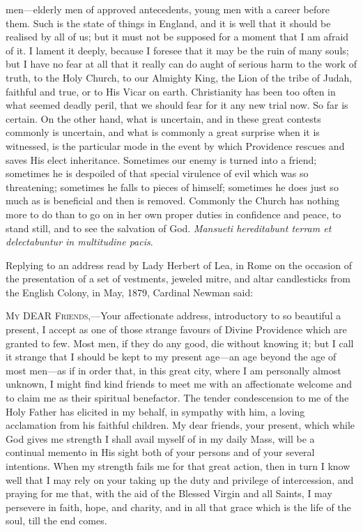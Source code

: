 men—elderly men of approved antecedents, young men with a career
before them. Such is the state of things in England, and it is well
that it should be realised by all of us; but it must not be supposed
for a moment that I am afraid of it. I lament it deeply, because I
foresee that it may be the ruin of many souls; but I have no fear at
all that it really can do aught of serious harm to the work of truth,
to the Holy Church, to our Almighty King, the Lion of the tribe of
Judah, faithful and true, or to His Vicar on earth. Christianity has
been too often in what seemed deadly peril, that we should fear for it
any new trial now. So far is certain. On the other hand, what is
uncertain, and in these great contests commonly is uncertain, and what
is commonly a great surprise when it is witnessed, is the particular
mode in the event by which Providence rescues and saves His elect
inheritance. Sometimes our enemy is turned into a friend; sometimes he
is despoiled of that special virulence of evil which was so
threatening; sometimes he falls to pieces of himself; sometimes he
does just so much as is beneficial and then is removed. Commonly the
Church has nothing more to do than to go on in her own proper duties
in confidence and peace, to stand still, and to see the salvation of
God. \emph{Mansueti hereditabunt terram et delectabuntur in multitudine
pacis}.


Replying to an address read by Lady Herbert of
Lea, in Rome on the occasion of the presentation of a set of
vestments, jeweled mitre, and altar candlesticks from the English
Colony, in May, 1879, Cardinal Newman said:

M\textsc{y} DEAR
F\textsc{riends},—Your affectionate address,
introductory to so beautiful a present, I accept as one of those
strange favours of Divine Providence which are granted to few. Most
men, if they do any good, die without knowing it; but I call it
strange that I should be kept to my present age—an age beyond the
age of most men—as if in order that, in this great city, where I am
personally almost unknown, I might find kind friends to meet me with
an affectionate welcome and to claim me as their spiritual benefactor.
The tender condescension to me of the Holy Father has elicited in my
behalf, in sympathy with him, a loving acclamation from his faithful
children. My dear friends, your present, which while God gives me
strength I shall avail myself of in my daily Mass, will be a continual
memento in His sight both of your persons and of your several
intentions. When my strength fails me for that great action, then in
turn I know well that I may rely on your taking up the duty and
privilege of intercession, and praying for me that, with the aid of
the Blessed Virgin and all Saints, I may persevere in faith, hope, and
charity, and in all that grace which is the life of the soul, till the
end comes.

